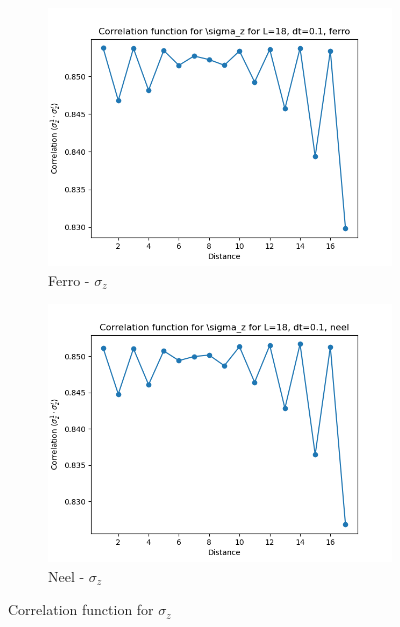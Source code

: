 \documentclass[12pt]{article}
\begin{document}
\begin{figure}[h!]
  \centering
  \begin{subfigure}[b]{0.4\textwidth}
    \includegraphics[width=\textwidth]{p4_1_correlation_sigma_z_L_18_dt_0.1_name_ferro.png}
    \caption{Ferro - $\sigma_z$}
  \end{subfigure}
  \hfill
  \begin{subfigure}[b]{0.4\textwidth}
    \includegraphics[width=\textwidth]{p4_1_correlation_sigma_z_L_18_dt_0.1_name_neel.png}
    \caption{Neel - $\sigma_z$}
  \end{subfigure}
  \caption{Correlation function for $\sigma_z$}
\end{figure}
\end{document}
